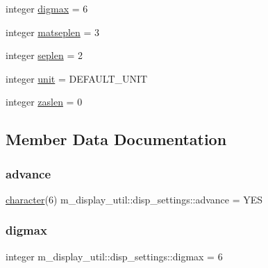 \begin{DoxyCompactItemize}
\item 
integer \hyperlink{structm__display__util_1_1disp__settings_a86d10863c537cd157d36853f75b80944}{digmax} = 6
\item 
integer \hyperlink{structm__display__util_1_1disp__settings_a9b53bed900042c22fbc10b7cedfafe3f}{matseplen} = 3
\item 
integer \hyperlink{structm__display__util_1_1disp__settings_adaf4314a29810ae42724f6e764a49f16}{seplen} = 2
\item 
integer \hyperlink{structm__display__util_1_1disp__settings_abed8dbd1ab1f752ce0d8536234fa2cd5}{unit} = D\+E\+F\+A\+U\+L\+T\+\_\+\+U\+N\+IT
\item 
integer \hyperlink{structm__display__util_1_1disp__settings_ae7f063147eddbe3cf5cd95549f23bca4}{zaslen} = 0
\end{DoxyCompactItemize}


\subsection{Member Data Documentation}
\mbox{\label{structm__display__util_1_1disp__settings_ac77c8a03ca8b219fba2729f1cdb696f1}} 
\subsubsection{\texorpdfstring{advance}{advance}}
{\footnotesize\ttfamily \hyperlink{option__stopwatch_83_8txt_abd4b21fbbd175834027b5224bfe97e66}{character}(6) m\+\_\+display\+\_\+util\+::disp\+\_\+settings\+::advance = \textquotesingle{}Y\+ES\textquotesingle{}\hspace{0.3cm}{\ttfamily [private]}}

\mbox{\label{structm__display__util_1_1disp__settings_a86d10863c537cd157d36853f75b80944}} 
\subsubsection{\texorpdfstring{digmax}{digmax}}
{\footnotesize\ttfamily integer m\+\_\+display\+\_\+util\+::disp\+\_\+settings\+::digmax = 6\hspace{0.3cm}{\ttfamily [private]}}

